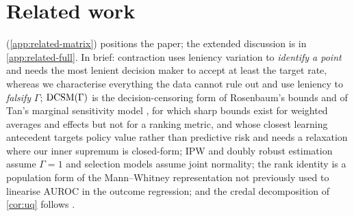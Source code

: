 \section{Related work}
\label{sec:related}

 (\cref{app:related-matrix}) positions the paper; the
extended discussion is in \cref{app:related-full}. In brief: contraction
\citep{lakkaraju2017selective, kleinberg2018human} uses leniency variation to
\emph{identify a point} and needs the most lenient decision maker to accept at
least the target rate, whereas we characterise everything the data cannot
rule out and use leniency to \emph{falsify} $\Gamma$; $\textup{DCSM}(\Gamma)$ is the
decision-censoring form of Rosenbaum's bounds and of Tan's marginal
sensitivity model \citep{rosenbaum2002observational, tan2006distributional},
for which sharp bounds exist for weighted averages and effects
\citep{dorn2023sharp, zhao2019sensitivity} but not for a ranking metric, and
whose closest learning antecedent \citep{kallus2018confounding} targets policy
value rather than predictive risk and needs a relaxation where our inner
supremum is closed-form; IPW and doubly robust estimation
\citep{robins1994estimation, chernozhukov2018double} assume $\Gamma=1$ and
selection models \citep{heckman1979sample} assume joint normality; the rank
identity is a population form of the Mann--Whitney representation
\citep{mann1947test} not previously used to linearise AUROC in the outcome
regression; and the credal decomposition of \cref{cor:uq} follows
\citet{abellan2005difference}.
